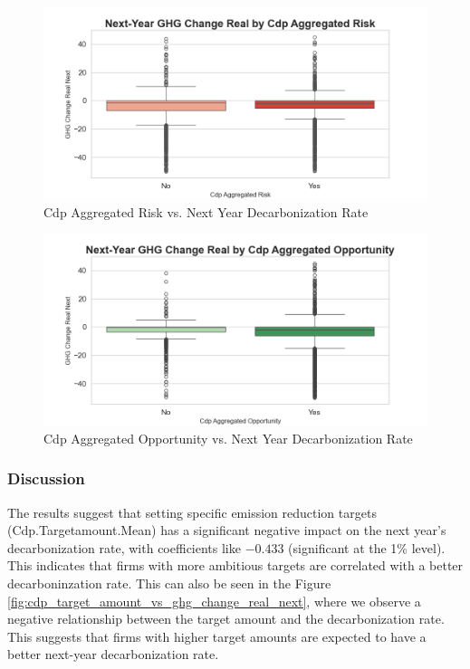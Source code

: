 \begin{figure}[H]
\centering
  \includegraphics[width=\textwidth]{figures/ghg_change_real_next_by_cdp_aggregated_risk.png}
\caption{Cdp Aggregated Risk vs. Next Year Decarbonization Rate}
\label{fig:ghg_change_real_next_by_cdp_aggregated_risk}
\end{figure}

\begin{figure}[H]
\centering
  \includegraphics[width=\textwidth]{figures/ghg_change_real_next_by_cdp_aggregated_opportunity.png}
\caption{Cdp Aggregated Opportunity vs. Next Year Decarbonization Rate}
\label{fig:ghg_change_real_next_by_cdp_aggregated_opportunity}
\end{figure}


\subsubsection{Discussion}
The results suggest that setting specific emission reduction targets (Cdp.Targetamount.Mean) has a significant negative impact on the next year's decarbonization rate, with coefficients like $-0.433$ (significant at the 1\% level). This indicates that firms with more ambitious targets are correlated with a better decarboninzation rate. This can also be seen in the Figure \ref{fig:cdp_target_amount_vs_ghg_change_real_next}, where we observe a negative relationship between the target amount and the decarbonization rate. This suggests that firms with higher target amounts are expected to have a better next-year decarbonization rate. 


